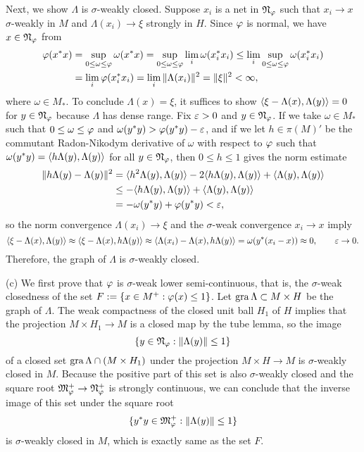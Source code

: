 \documentclass{../../large}
\begin{document}
\begin{pf}
Next, we show $\Lambda$ is $\sigma$-weakly closed.
Suppose $x_i$ is a net in $\mathfrak{N}_\varphi$ such that $x_i\to x$ $\sigma$-weakly in $M$ and $\Lambda(x_i)\to\xi$ strongly in $H$.
Since $\varphi$ is normal, we have $x\in\mathfrak{N}_\varphi$ from
\begin{align*}
\varphi(x^*x)&=\sup_{0\le\omega\le\varphi}\omega(x^*x)=\sup_{0\le\omega\le\varphi}\lim_i\omega(x_i^*x_i)\le\lim_i\sup_{0\le\omega\le\varphi}\omega(x_i^*x_i)\\
&=\lim_i\varphi(x_i^*x_i)=\lim_i\|\Lambda(x_i)\|^2=\|\xi\|^2<\infty,
\end{align*}
where $\omega\in M_*$.
To conclude $\Lambda(x)=\xi$, it suffices to show $\langle\xi-\Lambda(x),\Lambda(y)\rangle=0$ for $y\in\mathfrak{N}_\varphi$ because $\Lambda$ has dense range.
Fix $\varepsilon>0$ and $y\in\mathfrak{N}_\varphi$.
If we take $\omega\in M_*$ such that $0\le\omega\le\varphi$ and $\omega(y^*y)>\varphi(y^*y)-\varepsilon$, and if we let $h\in\pi(M)'$ be the commutant Radon-Nikodym derivative of $\omega$ with respect to $\varphi$ such that $\omega(y^*y)=\langle h\Lambda(y),\Lambda(y)\rangle$ for all $y\in\mathfrak{N}_\varphi$, then $0\le h\le1$ gives the norm estimate
\begin{align*}
\|h\Lambda(y)-\Lambda(y)\|^2
&=\langle h^2\Lambda(y),\Lambda(y)\rangle-2\langle h\Lambda(y),\Lambda(y)\rangle+\langle\Lambda(y),\Lambda(y)\rangle\\
&\le-\langle h\Lambda(y),\Lambda(y)\rangle+\langle\Lambda(y),\Lambda(y)\rangle\\
&=-\omega(y^*y)+\varphi(y^*y)<\varepsilon,
\end{align*}
so the norm convergence $\Lambda(x_i)\to\xi$ and the $\sigma$-weak convergence $x_i\to x$ imply
\[\langle\xi-\Lambda(x),\Lambda(y)\rangle\approx\langle\xi-\Lambda(x),h\Lambda(y)\rangle\approx\langle\Lambda(x_i)-\Lambda(x),h\Lambda(y)\rangle=\omega(y^*(x_i-x))\approx0,\qquad\varepsilon\to0.\]
Therefore, the graph of $\Lambda$ is $\sigma$-weakly closed.


(c)
We first prove that $\varphi$ is $\sigma$-weak lower semi-continuous, that is, the $\sigma$-weak closedness of the set $F:=\{x\in M^+:\varphi(x)\le1\}$.
Let $\operatorname{gra}\Lambda\subset M\times H$ be the graph of $\Lambda$.
The weak compactness of the closed unit ball $H_1$ of $H$ implies that the projection $M\times H_1\to M$ is a closed map by the tube lemma, so the image
\[\{y\in\mathfrak{N}_\varphi:\|\Lambda(y)\|\le1\}\]
of a closed set $\operatorname{gra}\Lambda\cap(M\times H_1)$ under the projection $M\times H\to M$ is $\sigma$-weakly closed in $M$.
Because the positive part of this set is also $\sigma$-weakly closed and the square root $\mathfrak{M}_\varphi^+\to\mathfrak{N}_\varphi^+$ is strongly continuous, we can conclude that the inverse image of this set under the square root
\[\{y^*y\in\mathfrak{M}_\varphi^+:\|\Lambda(y)\|\le1\}\]
is $\sigma$-weakly closed in $M$, which is exactly same as the set $F$.


\end{pf}
\end{document}
